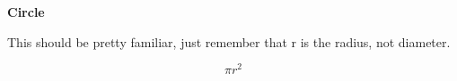 \item{\textbf{Circle}}
  
This should be pretty familiar, just remember that r is the radius, not diameter.

$$ \pi{r^{2} }$$
